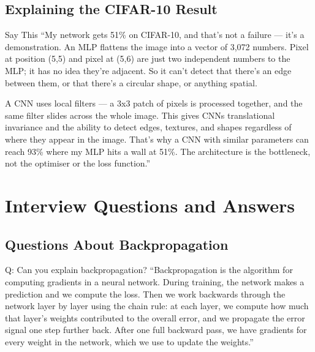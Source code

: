 \documentclass[12pt, a4paper]{article}
\begin{document}
\subsection{Explaining the CIFAR-10 Result}

\begin{interviewbox}{Say This}
``My network gets 51\% on CIFAR-10, and that's not a failure --- it's a demonstration. An MLP flattens the image into a vector of 3,072 numbers. Pixel at position (5,5) and pixel at (5,6) are just two independent numbers to the MLP; it has no idea they're adjacent. So it can't detect that there's an edge between them, or that there's a circular shape, or anything spatial.

A CNN uses local filters --- a 3x3 patch of pixels is processed together, and the same filter slides across the whole image. This gives CNNs translational invariance and the ability to detect edges, textures, and shapes regardless of where they appear in the image. That's why a CNN with similar parameters can reach 93\% where my MLP hits a wall at 51\%. The architecture is the bottleneck, not the optimiser or the loss function.''
\end{interviewbox}

\section{Interview Questions and Answers}

\subsection{Questions About Backpropagation}

\begin{interviewbox}{Q: Can you explain backpropagation?}
``Backpropagation is the algorithm for computing gradients in a neural network. During training, the network makes a prediction and we compute the loss. Then we work backwards through the network layer by layer using the chain rule: at each layer, we compute how much that layer's weights contributed to the overall error, and we propagate the error signal one step further back. After one full backward pass, we have gradients for every weight in the network, which we use to update the weights.''
\end{interviewbox}
\end{document}
